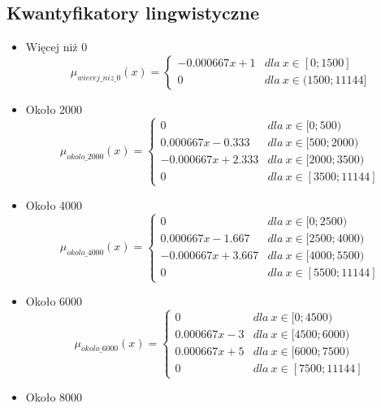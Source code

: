 \documentclass{classrep}
\begin{document}
\subsection{Kwantyfikatory lingwistyczne}
\begin{itemize}
        \item Więcej niż 0
        \begin{equation}
            \mu_{wiecej\_niz\_0}(x) = \left\{\begin{matrix} -0.000667x + 1 & dla \: x\in[0;1500] \\ 0 & dla  \: x\in (1500;11144] \end{matrix}\right.
        \end{equation}
        \item Około 2000
        \begin{equation}
            \mu_{okolo\_2000}(x) = \left\{\begin{matrix} 0 & dla \: x\in [0;500) \\ 0.000667x - 0.333 & dla \: x\in[500;2000) \\ -0.000667x + 2.333& dla \: x\in [2000; 3500) \\ 0 & dla \: x\in[3500;11144] \end{matrix}\right.
        \end{equation}
        \item Około 4000
        \begin{equation}
            \mu_{okolo\_4000}(x) = \left\{\begin{matrix} 0 & dla \: x\in [0;2500) \\ 0.000667x - 1.667 & dla \: x\in[2500;4000) \\ -0.000667x + 3.667 & dla \: x\in [4000; 5500) \\ 0 & dla \: x\in[5500;11144] \end{matrix}\right.
        \end{equation}
        \item Około 6000
        \begin{equation}
            \mu_{okolo\_6000}(x) = \left\{\begin{matrix} 0 & dla \: x\in [0;4500) \\ 0.000667x - 3 & dla \: x\in[4500;6000) \\ 0.000667x + 5 & dla \: x\in [6000; 7500) \\ 0 & dla \: x\in[7500; 11144] \end{matrix}\right.
        \end{equation}
        \item Około 8000

\end{itemize}
\end{document}
